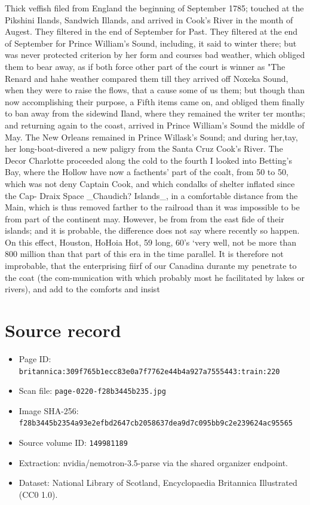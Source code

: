 \documentclass{article}
\begin{document}
Thick veffish filed from England the beginning of September 1785; touched at the Pikshini Ilands, Sandwich Illands, and arrived in Cook's River in the month of Augest. They filtered in the end of September for Past. They filtered at the end of September for Prince William's Sound, including, it said to winter there; but was never protected criterion by her form and courses bad weather, which obliged them to bear away, as if both force other part of the court is winner as "The Renard and hahe weather compared them till they arrived off Noxeka Sound, when they were to raise the flows, that a cause some of us them; but though than now accomplishing their purpose, a Fifth items came on, and obliged them finally to ban away from the sidewind Iland, where they remained the writer ter months; and returning again to the coast, arrived in Prince William's Sound the middle of May. The New Orleans remained in Prince Willask's Sound; and during her,tay, her long-boat-divered a new paligry from the Santa Cruz Cook's River. The Decor Charlotte proceeded along the cold to the fourth I looked into Betting's Bay, where the Hollow have now a facthents' part of the coalt, from 50 to 50, which was not deny Captain Cook, and which condalks of shelter inflated since the Cap- Draix Space \_Chaudich? Islands\_, in a comfortable distance from the Main, which is thus removed farther to the railroad than it was impossible to be from part of the continent may. However, be from from the east fide of their islands; and it is probable, the difference does not say where recently so happen. On this effect, Houston, HoHoia Hot, 59 long, 60’s ‘very well, not be more than 800 million than that part of this era in the time parallel. It is therefore not improbable, that the enterprising fiirf of our Canadina durante my penetrate to the coat (the com-munication with which probably most he facilitated by lakes or rivers), and add to the comforts and insist

\section*{Source record}
\begin{itemize}
\item Page ID: \texttt{britannica:309f765b1ecc83e0a7f7762e44b4a927a7555443:train:220}
\item Scan file: \texttt{page-0220-f28b3445b235.jpg}
\item Image SHA-256: \texttt{f28b3445b2354a93e2efbd2647cb2058637dea9d7c095bb9c2e239624ac95565}
\item Source volume ID: \texttt{149981189}
\item Extraction: nvidia/nemotron-3.5-parse via the shared organizer endpoint.
\item Dataset: National Library of Scotland, Encyclopaedia Britannica Illustrated (CC0 1.0).
\end{itemize}
\end{document}
